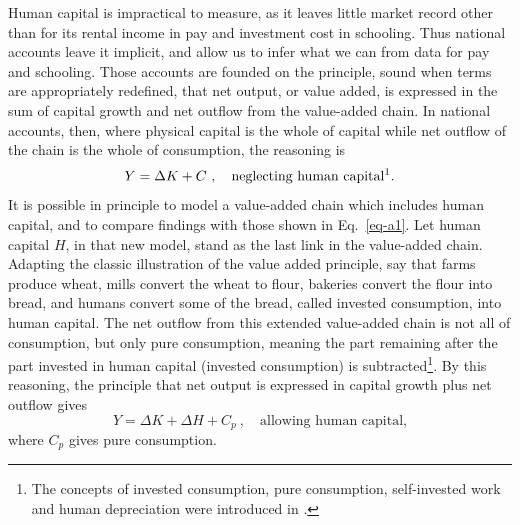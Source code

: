 \documentclass[a4paper,fleqn]{latex_styles/cas-sc}
\begin{document}
Human capital is impractical to measure, as it leaves little market
record other than for its rental income in pay and investment cost in schooling. Thus national accounts
leave it implicit, and allow us to infer what we can from data for pay and schooling. Those
accounts are founded on the principle, sound when terms are appropriately redefined, that net output,
or value added, is expressed in the sum of capital growth and net
outflow from the value-added chain. In national accounts, then, where
physical capital is the whole of capital while net outflow of the chain
is the whole of consumption, the reasoning is
%
\begin{equation}
Y = \Delta K + C \ , \quad \text{neglecting human capital\footnotemark.}\label{eq-a1}
\end{equation}
%
It is possible in principle to model a value-added chain which includes human
capital, and to compare findings with those shown in Eq.~\eqref{eq-a1}.
Let human capital $H$, in that new model, stand as the last link in the
value-added chain. Adapting the classic illustration of the value added
principle, say that farms produce wheat, mills convert the wheat to
flour, bakeries convert the flour into bread, and humans convert some of
the bread, called invested consumption, into human capital. The net
outflow from this extended value-added chain is not all of consumption,
but only pure consumption, meaning the part remaining after the part invested in human capital (invested consumption) is
subtracted\footnote{The concepts of invested consumption, pure consumption, self-invested work and human depreciation were introduced in \cite{schultzInvestmentHumanCapital1961}.}. By this reasoning, the principle
that net output is expressed in capital growth plus net outflow gives
%
\begin{equation} 
Y = \Delta K + \Delta H + C_{p}\ , \quad \text{allowing human capital,}\label{eq-a2} 
\end{equation}
%
where \(C_{p}\) gives pure consumption.
\end{document}
